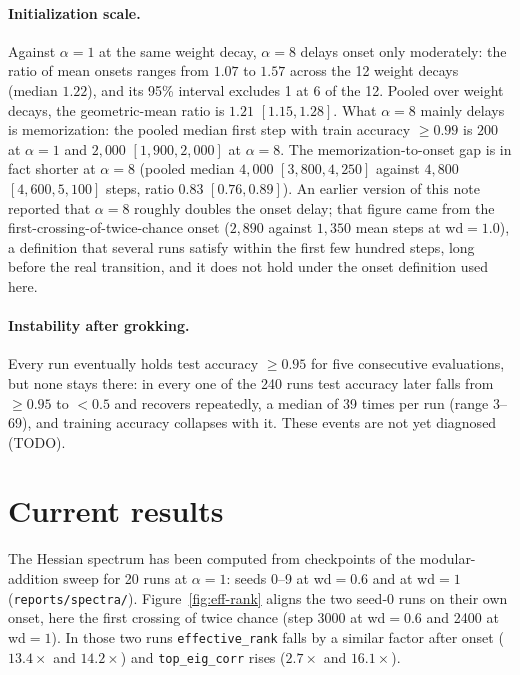 \documentclass[11pt,a4paper]{article}
\begin{document}
\paragraph{Initialization scale.} Against $\alpha=1$ at the same weight decay,
$\alpha=8$ delays onset only moderately: the ratio of mean onsets ranges from
$1.07$ to $1.57$ across the 12 weight decays (median $1.22$), and its 95\%
interval excludes 1 at 6 of the 12. Pooled over weight decays, the
geometric-mean ratio is $1.21$ $[1.15, 1.28]$. What $\alpha=8$ mainly delays is
memorization: the pooled median first step with train accuracy $\ge 0.99$ is
$200$ at $\alpha=1$ and $2{,}000$ $[1{,}900, 2{,}000]$ at $\alpha=8$. The
memorization-to-onset gap is in fact shorter at $\alpha=8$ (pooled median
$4{,}000$ $[3{,}800, 4{,}250]$ against $4{,}800$ $[4{,}600, 5{,}100]$ steps,
ratio $0.83$ $[0.76, 0.89]$). An earlier version of this note reported that
$\alpha=8$ roughly doubles the onset delay; that figure came from the
first-crossing-of-twice-chance onset ($2{,}890$ against $1{,}350$ mean steps at
wd$=1.0$), a definition that several runs satisfy within the first few hundred
steps, long before the real transition, and it does not hold under the onset
definition used here.

\paragraph{Instability after grokking.} Every run eventually holds test accuracy
$\ge 0.95$ for five consecutive evaluations, but none stays there: in every one
of the 240 runs test accuracy later falls from $\ge 0.95$ to $< 0.5$ and
recovers repeatedly, a median of 39 times per run (range 3--69), and training
accuracy collapses with it. These events are not yet diagnosed (TODO).

\section{Current results}
\label{sec:hess-status}

The Hessian spectrum has been computed from checkpoints of the
modular-addition sweep for 20 runs at $\alpha=1$: seeds 0--9 at wd$=0.6$ and at
wd$=1$ (\texttt{reports/spectra/}). Figure~\ref{fig:eff-rank} aligns the two
seed-0 runs on their own onset, here the first crossing of twice chance (step 3000
at wd$=0.6$ and 2400 at wd$=1$). In those two runs \texttt{effective\_rank}
falls by a similar factor after onset ($13.4\times$ and $14.2\times$) and
\texttt{top\_eig\_corr} rises ($2.7\times$ and $16.1\times$).
\end{document}
